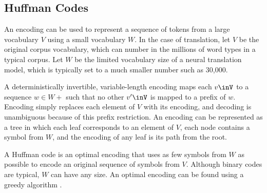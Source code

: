 \subsection{Huffman Codes}

An encoding can be used to represent a sequence of tokens from a large
vocabulary $V$ using a small vocabulary $W$. In the case of translation, let
$V$ be the original corpus vocabulary, which can number in the millions of word
types in a typical corpus. Let $W$ be the limited vocabulary size of a neural
translation model, which is typically set to a much smaller number such as
30,000.

A deterministically invertible, variable-length encoding maps each $v\inV$ to a
sequence $w \in W+$ such that no other $v'\inV$ is mapped to a prefix of $w$.
Encoding simply replaces each element of $V$ with its encoding, and decoding
is unambiguous because of this prefix restriction. An encoding can be represented as a tree in which each leaf corresponds to an element of $V$, each node contains a symbol from $W$, and the encoding of any leaf is its path from the root.

A Huffman code is an optimal encoding that uses as few symbols from $W$ as
possible to encode an original sequence of symbols from $V$. Although binary
codes are typical, $W$ can have any size. An optimal encoding can be found
using a greedy algorithm \cite{huffman}.


